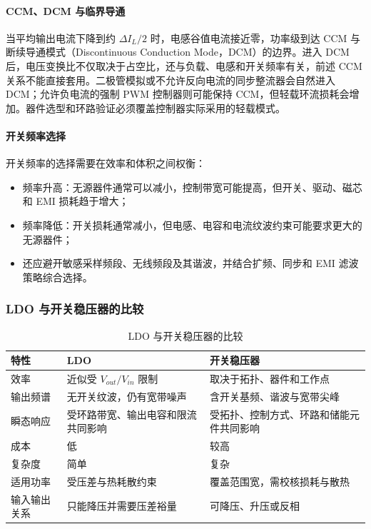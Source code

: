 \paragraph{CCM、DCM 与临界导通}

当平均输出电流下降到约 $\Delta I_L/2$ 时，电感谷值电流接近零，功率级到达 CCM 与断续导通模式（Discontinuous Conduction Mode，DCM）的边界。进入 DCM 后，电压变换比不仅取决于占空比，还与负载、电感和开关频率有关，前述 CCM 关系不能直接套用。二极管模拟或不允许反向电流的同步整流器会自然进入 DCM；允许负电流的强制 PWM 控制器则可能保持 CCM，但轻载环流损耗会增加。器件选型和环路验证必须覆盖控制器实际采用的轻载模式。

\paragraph{开关频率选择}

开关频率的选择需要在效率和体积之间权衡：
\begin{itemize}
  \item 频率升高：无源器件通常可以减小，控制带宽可能提高，但开关、驱动、磁芯和 EMI 损耗趋于增大；
  \item 频率降低：开关损耗通常减小，但电感、电容和电流纹波约束可能要求更大的无源器件；
  \item 还应避开敏感采样频段、无线频段及其谐波，并结合扩频、同步和 EMI 滤波策略综合选择。
\end{itemize}

\subsubsection{LDO 与开关稳压器的比较}

\begin{table}[H]
  \centering
  \caption{LDO 与开关稳压器的比较}
  \begin{tabular}{|p{}|p{}|p{}|}
    \hline
    特性 & LDO & 开关稳压器 \\
    \hline
    效率 & 近似受 $V_{out}/V_{in}$ 限制 & 取决于拓扑、器件和工作点 \\
    输出频谱 & 无开关纹波，仍有宽带噪声 & 含开关基频、谐波与宽带尖峰 \\
    瞬态响应 & 受环路带宽、输出电容和限流共同影响 & 受拓扑、控制方式、环路和储能元件共同影响 \\
    成本 & 低 & 较高 \\
    复杂度 & 简单 & 复杂 \\
    适用功率 & 受压差与热耗散约束 & 覆盖范围宽，需校核损耗与散热 \\
    输入输出关系 & 只能降压并需要压差裕量 & 可降压、升压或反相 \\
    \hline
  \end{tabular}
\end{table}

